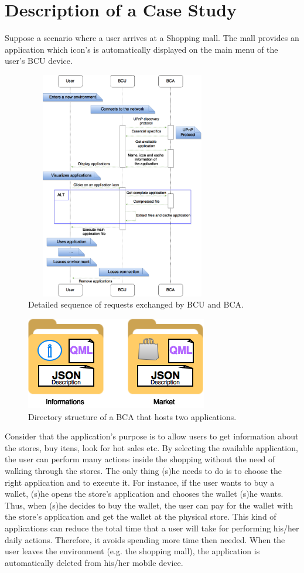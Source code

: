 \documentclass[journal]{IEEEtran}
\begin{document}
\section{Description of a Case Study}
Suppose a scenario where a user arrives at a Shopping mall. The mall provides an application which icon's is automatically displayed on the main menu of the user's BCU device.

\begin{figure}[!htb]
    \includegraphics[width = 8.5cm, height=10cm]{FIG4}
    \caption{Detailed sequence of requests exchanged by BCU and BCA.}
\end{figure}

\begin{figure}[!htb]
    \includegraphics[scale = 0.83]{FIG3}
    \caption{Directory structure of a BCA that hosts two applications.}
\end{figure}

Consider that the application's purpose is to allow users to get information about the stores, buy itens, look for hot sales etc. By selecting the available application, the user can perform many actions inside the shopping without the need of walking through the stores. The only thing (s)he needs to do is to choose the right application and to execute it. For instance, if the user wants to buy a wallet, (s)he opens the store's  application and chooses the wallet (s)he wants. Thus, when (s)he decides to buy the wallet, the user can pay for the wallet with the store's application and get the wallet at the physical store. This kind of applications can reduce the total time that a user will take for performing his/her daily actions. Therefore, it avoids spending more time then needed. When the user leaves the environment (e.g. the shopping mall), the application is automatically deleted from his/her mobile device.
\end{document}
